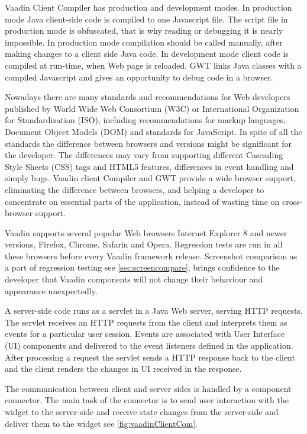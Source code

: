    Vaadin Client Compiler has production and development modes. 
   In production mode Java  client-side code is compiled to one Javascript file. The script file in
   production mode is obfuscated, that is why reading or debugging it is nearly
   impossible. In production mode compilation should be called manually,
   after making changes to a client side Java code.
   In development mode client code is compiled at run-time, when Web page
   is reloaded. GWT links Java classes  with a compiled Javascript and gives
   an opportunity to debug code in a browser.
  
   Nowadays there are many standards and recommendations for Web
   developers published by World Wide Web Consortium (W3C) or  International
   Organization for Standardization (ISO), including recommendations for
   markup languages, Document Object Models (DOM) and standards
   for JavaScript. In spite of all the standards the difference between browsers
   and versions might be significant for the developer. The differences may vary
   from supporting different Cascading Style Sheets (CSS) tags
   and HTML5 features, differences in event handling and simply bugs. Vaadin
   client Compiler and GWT provide a wide browser support, eliminating the difference between browsers, and helping a
   developer to concentrate on essential parts of the application, instead of
   wasting time on cross-browser support. 
   
   Vaadin supports several popular Web browsers Internet Explorer 8 and newer
   versions, Firefox, Chrome, Safarin and Opera. Regression tests are run
   in all these browsers before every Vaadin framework release. Screenshot
   comparison as a part of regression testing see \ref{sec:screencompare},
   brings confidence to the developer that Vaadin components will not change
   their behaviour and appearance unexpectedly.
   
   A server-side code runs as a servlet in a Java Web server, serving HTTP
   requests. The servlet receives an HTTP requests from the client and
   interprets them as events for a particular user session.
   Events are associated with User Interface (UI) components and delivered to
   the event listeners defined in the application. After processing a request
   the servlet sends a HTTP response back to the client and the client renders
   the changes in UI received in the response.
   
   The communication between client and server sides is handled by a component
   connector. The main task of the connector is to send user interaction
   with the widget to the server-side and receive state changes from the server-side 
   and deliver them to the widget see \ref{fig:vaadinClientCom}. 
    
